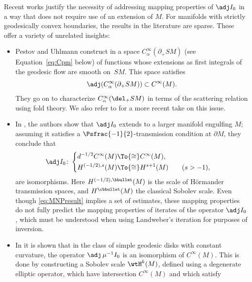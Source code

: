 Recent works \cite{Monard2017,Monard2019,Monard2020a} justify the necessity of addressing mapping properties of $\adj I_0$ in a way
that does not require use of an extension of $M$. For manifolds with strictly geodesically convex boundaries, the results in the literature are sparse. These offer a variety of unrelated insights:
\begin{itemize}
\item Pestov and Uhlmann construct in \cite{Pestov2005} a space $C_{\alpha}^\infty(\partial_+ SM)$ (see Equation~\eqref{eq:Cpm} below)
of functions whose extensions as first integrals of the geodesic flow are smooth on~$SM$. This space satisfies
\begin{equation}
\adj (C_\alpha^\infty(\partial_+ SM)) \subset C^\infty(M).
\label{eq:PU}
\end{equation}
They go on to characterize $C_\alpha^\infty (\del_+ SM)$ in terms of the scattering relation using fold theory. We also refer to
\cite{Paternain2021} for a more recent take on this issue.
\item In \cite{Monard2017}, the authors show that $\adj I_0$ extends to a larger manifold engulfing $M$; assuming it
satisfies a $\Psfrac{-1}{2}$-transmission condition at $\partial M$, they conclude that
\begin{equation}
\adj I_0 \colon
\begin{cases}
\begin{aligned}
d^{-1/2} C^\infty(M) & \To{\cong} C^\infty(M), \\
H^{(-1/2), s}(M) & \To{\cong} H^{s+1}(M) \qquad (s>-1),
\end{aligned}
\end{cases}
\label{eq:MNPresult}
\end{equation}
are isomorphisms. Here $H^{(-1/2), \bbullet}(M)$ is the scale of Hörmander transmission spaces, and $H^{\cbbullet}(M)$ the classical Sobolev
scale. Even though \eqref{eq:MNPresult} implies a set of estimates, these mapping properties do not fully predict the mapping
properties of iterates of the operator $\adj I_0$, which must be understood when using Landweber's iteration for purposes of inversion.
\item In \cite{Monard2019a} it is shown that in the class of simple geodesic disks with constant curvature, the operator $\adj \, \mu^{-1} I_0$ is
an isomorphism of $C^\infty(M)$. This is done by constructing a Sobolev scale $\wtH^k(M)$, defined using a degenerate elliptic operator,
which have intersection $C^\infty(M)$ and which satisfy
\begin{equation*}

\end{equation*}
\end{itemize}
